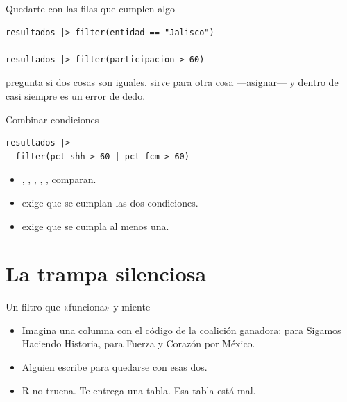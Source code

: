 \begin{frame}[fragile]{Quedarte con las filas que cumplen algo}
\begin{lstlisting}
resultados |> filter(entidad == "Jalisco")

resultados |> filter(participacion > 60)
\end{lstlisting}

  \vspace{0.6em}
  \cod{==} pregunta si dos cosas son iguales. \cod{=} sirve para otra cosa
  —asignar— y dentro de  casi siempre es un error de dedo.
\end{frame}

\begin{frame}[fragile]{Combinar condiciones}
\begin{lstlisting}
resultados |>
  filter(pct_shh > 60 | pct_fcm > 60)
\end{lstlisting}

  \vspace{0.6em}
  \begin{itemize}\setlength{\itemsep}{0.8em}
    \item<1-> \cod{==}, \cod{!=}, \cod{>}, \cod{<}, \cod{>=}, \cod{<=} comparan.
    \item<2-> \cod{\&} exige que se cumplan las dos condiciones.
    \item<3-> \cod{|} exige que se cumpla al menos una.
  \end{itemize}
\end{frame}

\section{La trampa silenciosa}

\begin{frame}{Un filtro que «funciona» y miente}
  \vspace{0.3em}
  \begin{itemize}\setlength{\itemsep}{0.9em}
    \item<1-> Imagina una columna con el código de la coalición ganadora:
           para Sigamos Haciendo Historia,  para Fuerza y
          Corazón por México.
    \item<2-> Alguien escribe  para quedarse
          con esas dos.
    \item<3-> R no truena. Te entrega una tabla. Esa tabla está mal.
  \end{itemize}
\end{frame}

